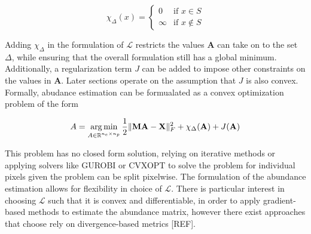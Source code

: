 \begin{equation}
    \label{ae:indfunc}
    \chi_{\Delta}(x) = 
            \begin{cases}
            0 &\text{if } x \in S \\
            \infty &\text{if } x \not \in S
            \end{cases}
\end{equation}

Adding $\chi_\Delta$ in the formulation of $\mathcal{L}$ restricts the values $\mathbf{A}$ can take on to the set $\Delta$, while ensuring that the overall formulation still has a global minimum. Additionally, a regularization term $J$ can be added to impose other constraints on the values in $\mathbf{A}$. Later sections operate on the assumption that $J$ is also convex. Formally, abudance estimation can be formualated as a convex optimization problem of the form

\begin{equation}
    \label{ae:ae-min-1}
    A = \operatorname*{arg\,min}_{A \in \mathbb{R}^{n_e \times n_p}} \frac{1}{2}\|\mathbf{MA} - \mathbf{X}\|_F^2 + \chi_\Delta(\mathbf{A}) + J(\mathbf{A})
\end{equation}

This problem has no closed form solution, relying on iterative methods or applying solvers like GUROBI or CVXOPT to solve the problem for individual pixels given the problem can be split pixelwise. The formulation of the abundance estimation allows for flexibility in choice of $\mathcal{L}$. There is particular interest in choosing $\mathcal{L}$ such that it is convex and differentiable, in order to apply gradient-based methods to estimate the abundance matrix, however there exist approaches that choose rely on divergence-based metrics [REF].